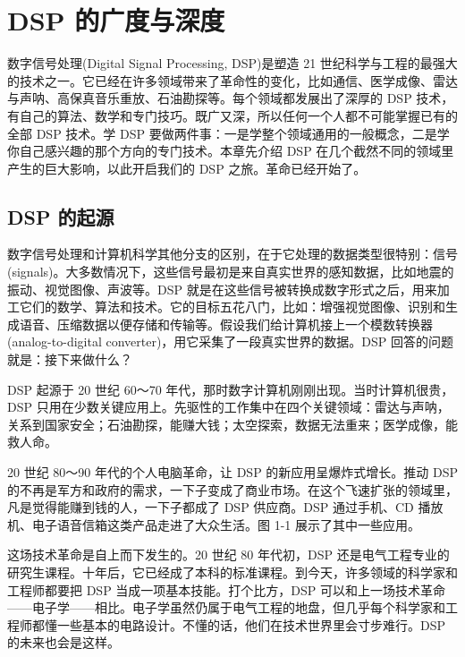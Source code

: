 
\chapter{DSP 的广度与深度}\label{ch-01}

数字信号处理(Digital Signal Processing, DSP)是塑造 21
世纪科学与工程的最强大的技术之一。它已经在许多领域带来了革命性的变化，比如通信、医学成像、雷达与声呐、高保真音乐重放、石油勘探等。每个领域都发展出了深厚的
DSP
技术，有自己的算法、数学和专门技巧。既广又深，所以任何一个人都不可能掌握已有的全部
DSP 技术。学 DSP
要做两件事：一是学整个领域通用的一般概念，二是学你自己感兴趣的那个方向的专门技术。本章先介绍
DSP 在几个截然不同的领域里产生的巨大影响，以此开启我们的 DSP
之旅。革命已经开始了。

\section{DSP 的起源}

数字信号处理和计算机科学其他分支的区别，在于它处理的数据类型很特别：信号(signals)。大多数情况下，这些信号最初是来自真实世界的感知数据，比如地震的振动、视觉图像、声波等。DSP
就是在这些信号被转换成数字形式之后，用来加工它们的数学、算法和技术。它的目标五花八门，比如：增强视觉图像、识别和生成语音、压缩数据以便存储和传输等。假设我们给计算机接上一个模数转换器(analog-to-digital
converter)，用它采集了一段真实世界的数据。DSP
回答的问题就是：接下来做什么？

DSP 起源于 20 世纪 60～70
年代，那时数字计算机刚刚出现。当时计算机很贵，DSP
只用在少数关键应用上。先驱性的工作集中在四个关键领域：雷达与声呐，关系到国家安全；石油勘探，能赚大钱；太空探索，数据无法重来；医学成像，能救人命。

20 世纪 80～90 年代的个人电脑革命，让 DSP 的新应用呈爆炸式增长。推动 DSP
的不再是军方和政府的需求，一下子变成了商业市场。在这个飞速扩张的领域里，凡是觉得能赚到钱的人，一下子都成了
DSP 供应商。DSP 通过手机、CD
播放机、电子语音信箱这类产品走进了大众生活。图 1-1 展示了其中一些应用。

这场技术革命是自上而下发生的。20 世纪 80 年代初，DSP
还是电气工程专业的研究生课程。十年后，它已经成了本科的标准课程。到今天，许多领域的科学家和工程师都要把
DSP 当成一项基本技能。打个比方，DSP
可以和上一场技术革命------电子学------相比。电子学虽然仍属于电气工程的地盘，但几乎每个科学家和工程师都懂一些基本的电路设计。不懂的话，他们在技术世界里会寸步难行。DSP
的未来也会是这样。

